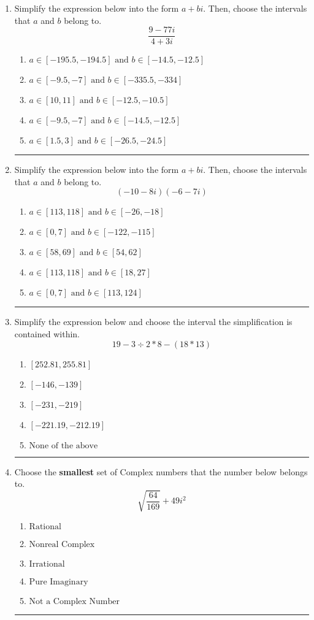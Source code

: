 \documentclass[14pt]{extbook}
\newcommand{\litem}[1]{\item#1\hspace*{-1cm}\rule{\textwidth}{0.4pt}}
\begin{document}
\begin{enumerate}
\litem{
Simplify the expression below into the form $a+bi$. Then, choose the intervals that $a$ and $b$ belong to.\[ \frac{9 - 77 i}{4 + 3 i} \]\begin{enumerate}[label=\Alph*.]
\item \( a \in [-195.5, -194.5] \text{ and } b \in [-14.5, -12.5] \)
\item \( a \in [-9.5, -7] \text{ and } b \in [-335.5, -334] \)
\item \( a \in [10, 11] \text{ and } b \in [-12.5, -10.5] \)
\item \( a \in [-9.5, -7] \text{ and } b \in [-14.5, -12.5] \)
\item \( a \in [1.5, 3] \text{ and } b \in [-26.5, -24.5] \)

\end{enumerate} }
\litem{
Simplify the expression below into the form $a+bi$. Then, choose the intervals that $a$ and $b$ belong to.\[ (-10 - 8 i)(-6 - 7 i) \]\begin{enumerate}[label=\Alph*.]
\item \( a \in [113, 118] \text{ and } b \in [-26, -18] \)
\item \( a \in [0, 7] \text{ and } b \in [-122, -115] \)
\item \( a \in [58, 69] \text{ and } b \in [54, 62] \)
\item \( a \in [113, 118] \text{ and } b \in [18, 27] \)
\item \( a \in [0, 7] \text{ and } b \in [113, 124] \)

\end{enumerate} }

\litem{
Simplify the expression below and choose the interval the simplification is contained within.\[ 19 - 3 \div 2 * 8 - (18 * 13) \]\begin{enumerate}[label=\Alph*.]
\item \( [252.81, 255.81] \)
\item \( [-146, -139] \)
\item \( [-231, -219] \)
\item \( [-221.19, -212.19] \)
\item \( \text{None of the above} \)

\end{enumerate} }
\litem{
Choose the \textbf{smallest} set of Complex numbers that the number below belongs to.\[ \sqrt{\frac{64}{169}} + 49i^2 \]\begin{enumerate}[label=\Alph*.]
\item \( \text{Rational} \)
\item \( \text{Nonreal Complex} \)
\item \( \text{Irrational} \)
\item \( \text{Pure Imaginary} \)
\item \( \text{Not a Complex Number} \)


\end{enumerate}}
\end{enumerate}
\end{document}

